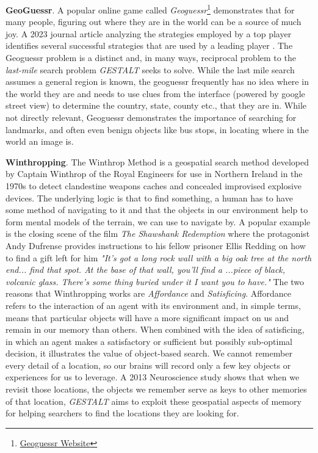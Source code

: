 \textbf{GeoGuessr}. A popular online game called \textit{Geoguessr}\footnote{\href{https://www.geoguessr.com/}{Geoguessr Website}} demonstrates that for many people, figuring out where they are in the world can be a source of much joy. 
A 2023 journal article analyzing the strategies employed by a top player identifies several successful strategies that are used by a leading player \cite{Berners-Lee2023}. 
The Geoguessr problem is a distinct and, in many ways, reciprocal problem to the \textit{last-mile} search problem \textit{GESTALT} seeks to solve. While the last mile search assumes a general region is known, the geoguessr frequently has no idea where in the world they are and needs to use clues from the interface (powered by google street view) to determine the country, state, county etc., that they are in. 
While not directly relevant, Geoguessr demonstrates the importance of searching for landmarks, and often even benign objects like bus stops, in locating where in the world an image is. 

\textbf{Winthropping}. The Winthrop Method is a geospatial search method developed by Captain Winthrop of the Royal Engineers for use in Northern Ireland in the 1970s\cite{Keatley2021} to detect clandestine weapons caches and concealed improvised explosive devices. 
The underlying logic is that to find something, a human has to have some method of navigating to it and that the objects in our environment help to form mental models of the terrain, we can use to navigate by. 
A popular example is the closing scene of the film \textit{The Shawshank Redemption} where the protagonist Andy Dufrense provides instructions to his fellow prisoner Ellis Redding on how to find a gift left for him \textit{"It's got a long rock wall with a big oak tree at the north end... find that spot. At the base of that wall, you'll find a ...piece of black, volcanic glass. There's some thing buried under it I want you to have."} 
The two reasons that Winthropping works are \textit{Affordance} and \textit{Satisficing}. Affordance refers to the interaction of an agent with its environment and, in simple terms, means that particular objects will have a more significant impact on us and remain in our memory than others. 
When combined with the idea of satisficing, in which an agent makes a satisfactory or sufficient but possibly sub-optimal decision, it illustrates the value of object-based search. 
We cannot remember every detail of a location, so our brains will record only a few key objects or experiences for us to leverage. 
A 2013 Neuroscience study shows that when we revisit those locations, the objects we remember serve as keys to other memories of that location\cite{Miller2013}, \textit{GESTALT} aims to exploit these geospatial aspects of memory for helping searchers to find the locations they are looking for.

